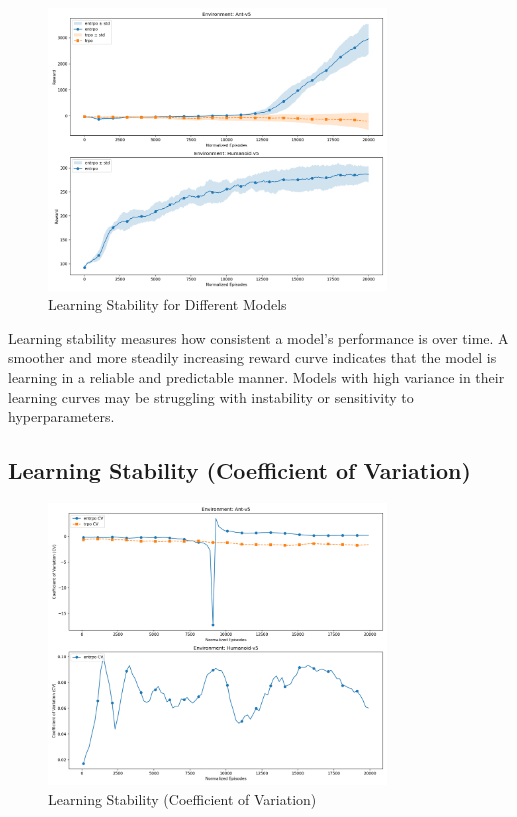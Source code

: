 \documentclass{article}
\begin{document}
\begin{figure}[H]
    \centering
    \includegraphics[width=0.8\textwidth]{.assets/learning_stability.png}
    \caption{Learning Stability for Different Models}
\end{figure}

Learning stability measures how consistent a model's performance is over time. A smoother and more steadily increasing reward curve indicates that the model is learning in a reliable and predictable manner. Models with high variance in their learning curves may be struggling with instability or sensitivity to hyperparameters.

\subsection*{Learning Stability (Coefficient of Variation)}

\begin{figure}[H]
    \centering
    \includegraphics[width=0.8\textwidth]{.assets/learning_stability_cv.png}
    \caption{Learning Stability (Coefficient of Variation)}
\end{figure}
\end{document}
